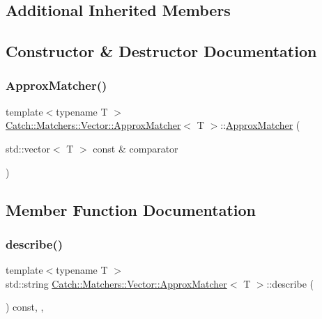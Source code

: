 \subsection*{Additional Inherited Members}


\subsection{Constructor \& Destructor Documentation}
\mbox{\label{struct_catch_1_1_matchers_1_1_vector_1_1_approx_matcher_a55e8f7018104e0730eef656a61646870}} 
\subsubsection{\texorpdfstring{ApproxMatcher()}{ApproxMatcher()}}
{\footnotesize\ttfamily template$<$typename T $>$ \\
\mbox{\hyperlink{struct_catch_1_1_matchers_1_1_vector_1_1_approx_matcher}{Catch\+::\+Matchers\+::\+Vector\+::\+Approx\+Matcher}}$<$ T $>$\+::\mbox{\hyperlink{struct_catch_1_1_matchers_1_1_vector_1_1_approx_matcher}{Approx\+Matcher}} (\begin{DoxyParamCaption}\item[{std\+::vector$<$ T $>$ const \&}]{comparator }\end{DoxyParamCaption})\hspace{0.3cm}{\ttfamily [inline]}}



\subsection{Member Function Documentation}
\mbox{\label{struct_catch_1_1_matchers_1_1_vector_1_1_approx_matcher_a1a9237e24c513c1448fa0624b3e14232}} 
\subsubsection{\texorpdfstring{describe()}{describe()}}
{\footnotesize\ttfamily template$<$typename T $>$ \\
std\+::string \mbox{\hyperlink{struct_catch_1_1_matchers_1_1_vector_1_1_approx_matcher}{Catch\+::\+Matchers\+::\+Vector\+::\+Approx\+Matcher}}$<$ T $>$\+::describe (\begin{DoxyParamCaption}{ }\end{DoxyParamCaption}) const\hspace{0.3cm}{\ttfamily [inline]}, {\ttfamily [override]}, {\ttfamily [virtual]}}



